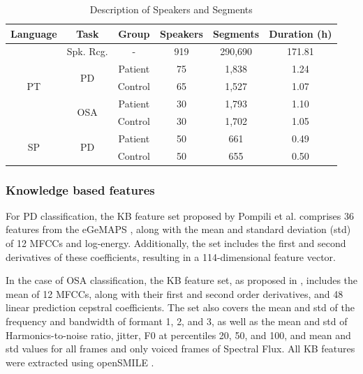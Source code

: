 \begin{table}[h]
  \centering
  \begin{tabular}{cccccc}
  \hline
  Language & Task & Group & Speakers & Segments & Duration (h) \\
    \hline
  \multirow{5}{*}{PT} & Spk. Rcg. & - & 919 & 290,690 & 171.81  \\ \cline{2-6}
  & \multirow{2}{*}{PD} & Patient & 75 & 1,838 & 1.24 \\
  & & Control & 65 & 1,527 & 1.07 \\ \cline{2-6}
  & \multirow{2}{*}{OSA} & Patient & 30 & 1,793 & 1.10 \\
  &  & Control & 30 & 1,702 & 1.05 \\
  \hline
  \multirow{2}{*}{SP} & \multirow{2}{*}{PD} & Patient & 50 & 661 & 0.49 \\
  & & Control & 50 & 655 & 0.50 \\

  \hline
  \end{tabular}
  \caption{Description of Speakers and Segments}
  \label{tab:xvect_data}
  \end{table}
  

\subsubsection{Knowledge based features}
For PD classification, the KB feature set proposed by Pompili et al. \cite{pompili2017automatic} comprises 36 features from the eGeMAPS \cite{eyben2015geneva}, along with the mean and standard deviation (std) of 12 MFCCs and log-energy. Additionally, the set includes the first and second derivatives of these coefficients, resulting in a 114-dimensional feature vector.

In the case of OSA classification, the KB feature set, as proposed in \cite{botelho2019speech}, includes the mean of 12 MFCCs, along with their first and second order derivatives, and 48 linear prediction cepstral coefficients. The set also covers the mean and std of the frequency and bandwidth of formant 1, 2, and 3, as well as the mean and std of Harmonics-to-noise ratio, jitter, F0 at percentiles 20, 50, and 100, and mean and std values for all frames and only voiced frames of Spectral Flux. All KB features were extracted using openSMILE \cite{eyben2013recent}.

